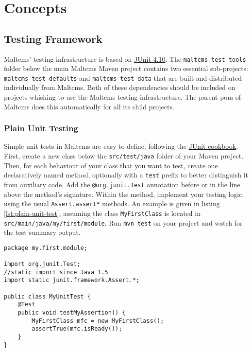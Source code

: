 \chapter{Concepts}\label{cha:maltcms}

\section{Testing Framework}\label{sec:testing-framework}
Maltcms' testing infrastructure is based on \href{http://www.junit.org}{JUnit 4.10}. The \verb|maltcms-test-tools| folder below the main Maltcms 
Maven project contains two essential sub-projects: \verb|maltcms-test-defaults| and \verb|maltcms-test-data| that are built and distributed individually
from Maltcms. Both of these dependencies should be included on projects whishing to use the Maltcms testing infrastructure. The parent pom of Maltcms does 
this automatically for all its child projects.

\subsection{Plain Unit Testing}\label{sec:plain-unit-testing}
Simple unit tests in Maltcms are easy to define, following the \href{http://junit.sourceforge.net/doc/cookbook/cookbook.htm}{JUnit cookbook}. First,
create a new class below the \verb|src/test/java| folder of your Maven project. Then, for each behaviour of your class that you want to test, create 
one declaratively named method, optionally with a \verb|test| prefix to better distinguish it from auxiliary code. Add the \verb|@org.junit.Test| annotation
before or in the line above the method's signature. Within the method, implement your testing logic, using the usual \verb|Assert.assert*| methods. An example is given in listing \ref{lst:plain-unit-test}, assuming the class \verb|MyFirstClass| is located in \verb|src/main/java/my/first/module|.
Run \verb|mvn test| on your project and watch for the test summary output.

\begin{lstlisting}[caption={[Plain unit test]Example of a plain unit test},label=lst:plain-unit-test]
package my.first.module;

import org.junit.Test;
//static import since Java 1.5
import static junit.framework.Assert.*;

public class MyUnitTest {	
	@Test
	public void testMyAssertion() {
		MyFirstClass mfc = new MyFirstClass();
		assertTrue(mfc.isReady());
	}
}
\end{lstlisting}

